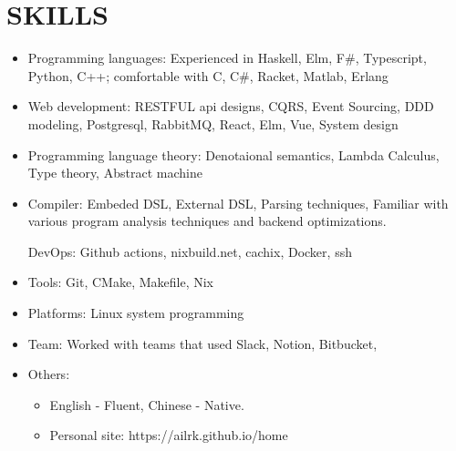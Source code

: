 \documentclass{resume}
\begin{document}
\section{SKILLS}
    \begin{itemize}


    \item Programming languages:
        Experienced in Haskell, Elm, F\#, Typescript, Python, C++; comfortable with C, C\#, Racket, Matlab, Erlang

    \item Web development:
        RESTFUL api designs, CQRS, Event Sourcing, DDD modeling, Postgresql, RabbitMQ, React, Elm, Vue, System design

    \item Programming language theory:
        Denotaional semantics, Lambda Calculus, Type theory, Abstract machine

    \item Compiler:
        Embeded DSL, External DSL, Parsing techniques, Familiar with various program analysis techniques and backend optimizations.

    DevOps:
        Github actions, nixbuild.net, cachix, Docker, ssh

    \item Tools: Git, CMake, Makefile, Nix

    \item Platforms: Linux system programming

    \item Team: Worked with teams that used Slack, Notion, Bitbucket, 

    \item Others:
        \begin{itemize}
            \item English - Fluent, Chinese - Native.
            \item Personal site: https://ailrk.github.io/home
        \end{itemize}

    \end{itemize}
\end{document}
